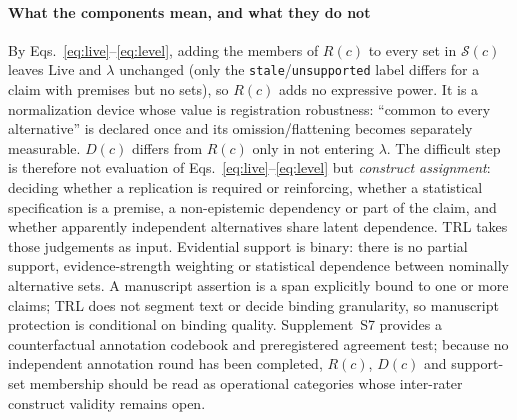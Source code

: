 \documentclass[cmc,article,submit,moreauthors,pdftex]{Definitions/tsp}
\begin{document}
\paragraph{What the components mean, and what they do not}
By Eqs.~\eqref{eq:live}--\eqref{eq:level}, adding the members of $R(c)$ to every set in $\mathcal{S}(c)$ leaves $\mathrm{Live}$ and $\lambda$ unchanged (only the \texttt{stale}/\texttt{unsupported} label differs for a claim with premises but no sets), so $R(c)$ adds no expressive power. It is a normalization device whose value is registration robustness: ``common to every alternative'' is declared once and its omission/flattening becomes separately measurable. $D(c)$ differs from $R(c)$ only in not entering $\lambda$. The difficult step is therefore not evaluation of Eqs.~\eqref{eq:live}--\eqref{eq:level} but \emph{construct assignment}: deciding whether a replication is required or reinforcing, whether a statistical specification is a premise, a non-epistemic dependency or part of the claim, and whether apparently independent alternatives share latent dependence. TRL takes those judgements as input. Evidential support is binary: there is no partial support, evidence-strength weighting or statistical dependence between nominally alternative sets. A manuscript assertion is a span explicitly bound to one or more claims; TRL does not segment text or decide binding granularity, so manuscript protection is conditional on binding quality. Supplement~S7 provides a counterfactual annotation codebook and preregistered agreement test; because no independent annotation round has been completed, $R(c)$, $D(c)$ and support-set membership should be read as operational categories whose inter-rater construct validity remains open.
\end{document}
